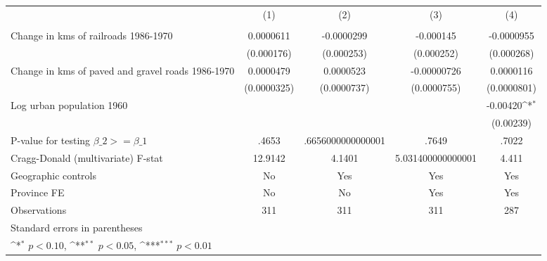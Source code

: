 {
\def\sym#1{\ifmmode^{#1}\else\(^{#1}\)\fi}
\begin{tabular}{l*{4}{c}}
\hline\hline
                &\multicolumn{1}{c}{(1)}&\multicolumn{1}{c}{(2)}&\multicolumn{1}{c}{(3)}&\multicolumn{1}{c}{(4)}\\
                &\multicolumn{1}{c}{}&\multicolumn{1}{c}{}&\multicolumn{1}{c}{}&\multicolumn{1}{c}{}\\
\hline
Change in kms of railroads 1986-1970&0.0000611         &-0.0000299         &-0.000145         &-0.0000955         \\
                &(0.000176)         &(0.000253)         &(0.000252)         &(0.000268)         \\
[1em]
Change in kms of paved and gravel roads 1986-1970&0.0000479         &0.0000523         &-0.00000726         &0.0000116         \\
                &(0.0000325)         &(0.0000737)         &(0.0000755)         &(0.0000801)         \\
[1em]
Log urban population 1960&                  &                  &                  & -0.00420\sym{*}  \\
                &                  &                  &                  &(0.00239)         \\
\hline
P-value for testing $\beta\_{2} >= \beta\_{1}$&    .4653         &.6656000000000001         &    .7649         &    .7022         \\
Cragg-Donald (multivariate) F-stat&  12.9142         &   4.1401         &5.031400000000001         &    4.411         \\
Geographic controls&       No         &      Yes         &      Yes         &      Yes         \\
Province FE     &       No         &       No         &      Yes         &      Yes         \\
Observations    &      311         &      311         &      311         &      287         \\
\hline\hline
\multicolumn{5}{l}{\footnotesize Standard errors in parentheses}\\
\multicolumn{5}{l}{\footnotesize \sym{*} \(p<0.10\), \sym{**} \(p<0.05\), \sym{***} \(p<0.01\)}\\
\end{tabular}
}
